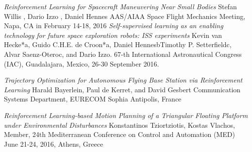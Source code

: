 \documentclass[a4paper,6pt]{article}
\theoremstyle{Definition}
\theoremstyle{Theorem}
\begin{document}
     \begin{thebibliography}{}
     

 


\textit{Reinforcement Learning for Spacecraft Maneuvering Near Small Bodies}
Stefan Willis
, Dario Izzo
, Daniel Hennes
AAS/AIAA Space Flight Mechanics Meeting, Napa, CA in February 14-18, 2016
\textit{Self-supervised learning as an enabling technology
for future space exploration robots: ISS experiments}
Kevin van Hecke*a, Guido C.H.E. de Croon*a, Daniel HennesbTimothy P. Setterfieldc, Alvar Saenz-Oteroc, and Dario Izzo.
67-th International Astronautical Congress (IAC), Guadalajara, Mexico, 26-30 September 2016.

\textit{Trajectory Optimization for Autonomous Flying
Base Station via Reinforcement Learning}
Harald Bayerlein, Paul de Kerret, and David Gesbert
Communication Systems Department, EURECOM
Sophia Antipolis, France

\textit{Reinforcement Learning-based Motion Planning of a Triangular
Floating Platform under Environmental Disturbances}
Konstantinos Tziortziotis, Kostas Vlachos, Member, 24th Mediterranean Conference on Control and Automation (MED)
June 21-24, 2016, Athens, Greece

      \end{thebibliography}
\end{document}
